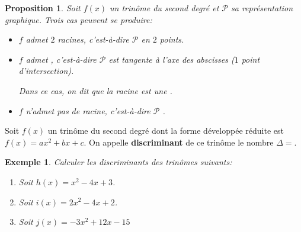\documentclass{beamer}
\newtheorem{proposition}{Proposition}
\newtheorem{exemple}{Exemple}
\begin{document}
\begin{frame}
 
\end{frame}

\begin{frame}
  \begin{proposition}
   Soit $f(x)$ un trinôme du second degré et $\mathcal{P}$ sa représentation graphique.
    Trois cas peuvent se produire:
   
   \begin{itemize}
    \item $f$ admet $2$ racines, c'est-à-dire $\mathcal{P}$ 
    en $2$ points.
    \item $f$ admet , c'est-à-dire $\mathcal{P}$
    est tangente à l'axe
    des abscisses ($1$ point d'intersection).
    
    Dans ce cas, on dit que la racine est une .
    
    \item $f$ n'admet pas de racine, c'est-à-dire $\mathcal{P}$ 
    .
   \end{itemize}
   
  \end{proposition}
\end{frame}

\begin{frame}
 \begin{definition}[Discriminant]
    Soit $f(x)$ un trinôme du second degré dont la forme développée réduite
    est $f(x)=ax^2+bx+c$. On appelle \textbf{discriminant} de ce trinôme
    le nombre $\Delta=$.
    
  \end{definition}
  
  \begin{exemple}
    
    Calculer les discriminants des trinômes suivants:
    \begin{enumerate}
     \item Soit $h(x)=x^2-4x+3$.
     \item Soit $i(x)=2x^2-4x+2$.
     \item Soit $j(x)=-3x^2+12x-15$
    \end{enumerate}
   \end{exemple}
\end{frame}

\begin{frame}
 
\end{frame}
\end{document}
